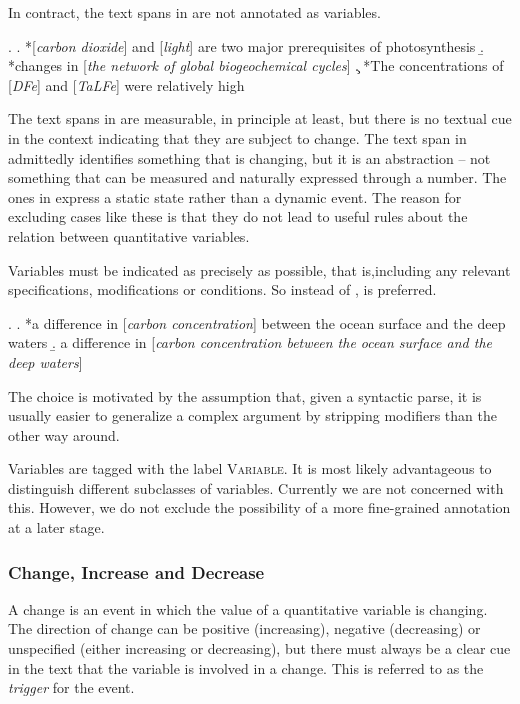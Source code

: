 \documentclass[10pt, a4paper]{article}
\newcommand{\tag}[1]{\textsc{#1}}
\begin{document}
In contract, the text spans in \Next are not annotated as variables.

\ex.
  \a. *[\emph{carbon dioxide}] and [\emph{light}] are two major prerequisites of photosynthesis
  \b. *changes in [\emph{the network of global biogeochemical cycles}] 
  \c. *The concentrations of [\emph{DFe}] and [\emph{TaLFe}] were relatively high

The text spans in \Last[a] are measurable, in principle at least, but there is no textual cue in the context indicating that they are subject to change. 
The text span in \Last[b] admittedly identifies something that is changing, but it is an abstraction -- not something that can be measured and naturally expressed through a number. 
The ones in \Last[c] express a static state rather than a dynamic event.
The reason for excluding cases like these is that they do not lead to useful rules about the relation between quantitative variables.

Variables must be indicated as precisely as possible, that is,including any relevant specifications, modifications or conditions. So instead of \Next[a], \Next[b] is preferred.

\ex.
  \a. *a difference in [\emph{carbon concentration}] between the ocean surface and the deep waters
  \b. a difference in [\emph{carbon concentration between the ocean surface and the deep waters}]

The choice is motivated by the assumption that, given a syntactic parse, it is usually easier to generalize a complex argument by stripping modifiers than the other way around.  

Variables are tagged with the label \tag{Variable}. 
It is most likely advantageous to distinguish different subclasses of variables. 
Currently we are not concerned with this. 
However, we do not exclude the possibility of a more fine-grained annotation at a later stage. 


\subsubsection{Change, Increase and Decrease}

A change is an event in which the value of a quantitative variable is changing.
The direction of change can be positive (increasing), negative (decreasing) or unspecified (either increasing or decreasing), but there must always be a clear cue in the text that the variable is involved in a change.
This is referred to as the \emph{trigger} for the event.
\end{document}
